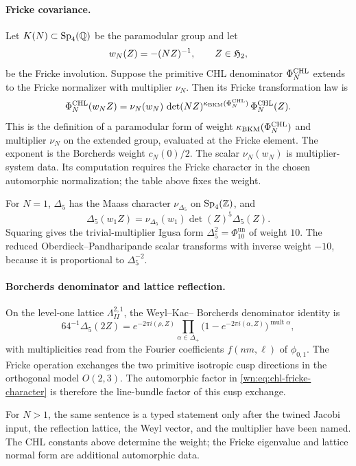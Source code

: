 \paragraph{Fricke covariance.}
Let \(K(N)\subset \mathrm{Sp}_4(\mathbb{Q})\) be the paramodular group and let
\[
  w_N(Z)=-(NZ)^{-1},\qquad Z\in\mathfrak{H}_2,
\]
be the Fricke involution.  Suppose the primitive CHL denominator
\(\Phi^{\mathrm{CHL}}_N\) extends to the Fricke normalizer with multiplier
\(\nu_N\).  Then its Fricke transformation law is
\begin{equation}
  \Phi^{\mathrm{CHL}}_N(w_N Z)
  =
  \nu_N(w_N)\,\det(NZ)^{\kappa_{\mathrm{BKM}}(\Phi^{\mathrm{CHL}}_N)}\,\Phi^{\mathrm{CHL}}_N(Z).
  \label{wn:eq:chl-fricke-character}
\end{equation}
This is the definition of a paramodular form of weight
\(\kappa_{\mathrm{BKM}}(\Phi^{\mathrm{CHL}}_N)\) and multiplier \(\nu_N\) on the extended group,
evaluated at the Fricke element.  The exponent is the Borcherds weight
\(c_N(0)/2\).  The scalar \(\nu_N(w_N)\) is multiplier-system data.  Its
computation requires the Fricke character in the chosen automorphic
normalization; the table above fixes the weight.

For \(N=1\), \(\Delta_5\) has the Maass character
\(\nu_{\Delta_5}\) on \(\mathrm{Sp}_4(\mathbb{Z})\), and
\[
  \Delta_5(w_1 Z)=\nu_{\Delta_5}(w_1)\det(Z)^5\Delta_5(Z).
\]
Squaring gives the trivial-multiplier Igusa form
\(\Delta_5^2=\Phi_{10}^{\mathrm{un}}\) of weight \(10\).  The reduced
Oberdieck--Pandharipande scalar transforms with inverse weight
\(-10\), because it is proportional to \(\Delta_5^{-2}\).

\paragraph{Borcherds denominator and lattice reflection.}
On the level-one lattice \(\Lambda^{2,1}_{II}\), the Weyl--Kac--
Borcherds denominator identity is
\[
  64^{-1}\Delta_5(2Z)
  =
  e^{-2\pi i(\rho,Z)}
  \prod_{\alpha\in \Delta_+}
  \bigl(1-e^{-2\pi i(\alpha,Z)}\bigr)^{\operatorname{mult}\alpha},
\]
with multiplicities read from the Fourier coefficients \(f(nm,\ell)\)
of \(\phi_{0,1}\).  The Fricke operation exchanges the two primitive
isotropic cusp directions in the orthogonal model \(O(2,3)\).  The
automorphic factor in \eqref{wn:eq:chl-fricke-character} is therefore
the line-bundle factor of this cusp exchange.

For \(N>1\), the same sentence is a typed statement only after the
twined Jacobi input, the reflection lattice, the Weyl vector, and the
multiplier have been named.  The CHL constants above determine the
weight; the Fricke eigenvalue and lattice normal form are additional
automorphic data.

